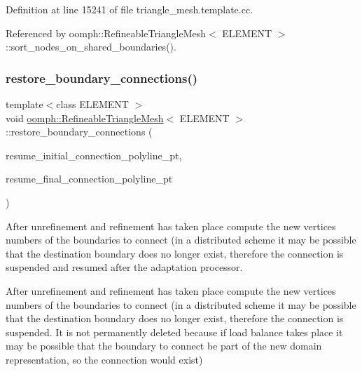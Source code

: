 Definition at line 15241 of file triangle\+\_\+mesh.\+template.\+cc.



Referenced by oomph\+::\+Refineable\+Triangle\+Mesh$<$ E\+L\+E\+M\+E\+N\+T $>$\+::sort\+\_\+nodes\+\_\+on\+\_\+shared\+\_\+boundaries().

\mbox{\label{classoomph_1_1RefineableTriangleMesh_a844986a9cfbce009209f0e01ef5f5918}} 
\subsubsection{\texorpdfstring{restore\+\_\+boundary\+\_\+connections()}{restore\_boundary\_connections()}}
{\footnotesize\ttfamily template$<$class E\+L\+E\+M\+E\+NT $>$ \\
void \hyperlink{classoomph_1_1RefineableTriangleMesh}{oomph\+::\+Refineable\+Triangle\+Mesh}$<$ E\+L\+E\+M\+E\+NT $>$\+::restore\+\_\+boundary\+\_\+connections (\begin{DoxyParamCaption}\item[{Vector$<$ Triangle\+Mesh\+Poly\+Line $\ast$$>$ \&}]{resume\+\_\+initial\+\_\+connection\+\_\+polyline\+\_\+pt,  }\item[{Vector$<$ Triangle\+Mesh\+Poly\+Line $\ast$$>$ \&}]{resume\+\_\+final\+\_\+connection\+\_\+polyline\+\_\+pt }\end{DoxyParamCaption})\hspace{0.3cm}{\ttfamily [protected]}}



After unrefinement and refinement has taken place compute the new vertices numbers of the boundaries to connect (in a distributed scheme it may be possible that the destination boundary does no longer exist, therefore the connection is suspended and resumed after the adaptation processor. 

After unrefinement and refinement has taken place compute the new vertices numbers of the boundaries to connect (in a distributed scheme it may be possible that the destination boundary does no longer exist, therefore the connection is suspended. It is not permanently deleted because if load balance takes place it may be possible that the boundary to connect be part of the new domain representation, so the connection would exist) 

